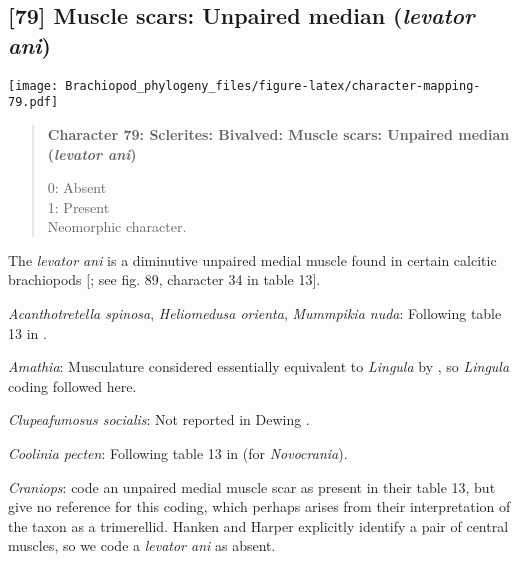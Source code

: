 \documentclass[openany]{book}
\theoremstyle{definition}
\theoremstyle{definition}
\theoremstyle{definition}
\theoremstyle{remark}
\begin{document}
\subsection*{\texorpdfstring{{[}79{]} Muscle scars: Unpaired median
(\emph{levator
ani})}{{[}79{]} Muscle scars: Unpaired median (levator ani)}}\label{muscle-scars-unpaired-median-levator-ani}

\texttt{[image: Brachiopod\_phylogeny\_files/figure-latex/character-mapping-79.pdf]}

\begin{quote}
\textbf{Character 79: Sclerites: Bivalved: Muscle scars: Unpaired median
(\emph{levator ani})}

0: Absent\\
1: Present\\
Neomorphic character.
\end{quote}

The \emph{levator ani} is a diminutive unpaired medial muscle found in
certain calcitic brachiopods
{[}\citet{Williams2000LinguliformeaCraniiformea}; see fig. 89, character
34 in table 13{]}.

\hypertarget{Acanthotretella_spinosa-coding-79}{}
\emph{Acanthotretella spinosa}, \emph{Heliomedusa orienta},
\emph{Mummpikia nuda}: Following table 13 in
\citet{Williams2000LinguliformeaCraniiformea}.

\hypertarget{Amathia-coding-79}{}
\emph{Amathia}: Musculature considered essentially equivalent to
\emph{Lingula} by \citet{Williams2000LinguliformeaCraniiformea}, so
\emph{Lingula} coding followed here.

\hypertarget{Clupeafumosus_socialis-coding-79}{}
\emph{Clupeafumosus socialis}: Not reported in Dewing
\citeyearpar{Dewing2001Hingemodifications}.

\hypertarget{Coolinia_pecten-coding-79}{}
\emph{Coolinia pecten}: Following table 13 in
\citet{Williams2000LinguliformeaCraniiformea} (for \emph{Novocrania}).

\hypertarget{Craniops-coding-79}{}
\emph{Craniops}: \citet{Williams2000LinguliformeaCraniiformea} code an
unpaired medial muscle scar as present in their table 13, but give no
reference for this coding, which perhaps arises from their
interpretation of the taxon as a trimerellid. Hanken and Harper
\citeyearpar[p.~249 and text-fig. 2]{Hanken1985Thetaxonomy} explicitly
identify a pair of central muscles, so we code a \emph{levator ani} as
absent.
\end{document}
